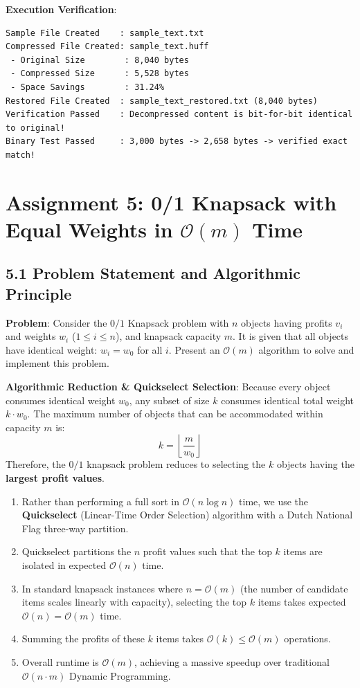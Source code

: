 \documentclass[12pt]{article}
\begin{document}
\textbf{Execution Verification}:
\begin{lstlisting}
Sample File Created    : sample_text.txt
Compressed File Created: sample_text.huff
 - Original Size        : 8,040 bytes
 - Compressed Size      : 5,528 bytes
 - Space Savings        : 31.24%
Restored File Created  : sample_text_restored.txt (8,040 bytes)
Verification Passed    : Decompressed content is bit-for-bit identical to original!
Binary Test Passed     : 3,000 bytes -> 2,658 bytes -> verified exact match!
\end{lstlisting}

\newpage

\section*{Assignment 5: 0/1 Knapsack with Equal Weights in $\mathcal{O}(m)$ Time}

\subsection*{5.1 Problem Statement and Algorithmic Principle}
\textbf{Problem}: Consider the $0/1$ Knapsack problem with $n$ objects having profits $v_i$ and weights $w_i$ ($1 \le i \le n$), and knapsack capacity $m$. It is given that all objects have identical weight: $w_i = w_0$ for all $i$. Present an $\mathcal{O}(m)$ algorithm to solve and implement this problem.

\textbf{Algorithmic Reduction \& Quickselect Selection}:
Because every object consumes identical weight $w_0$, any subset of size $k$ consumes identical total weight $k \cdot w_0$. The maximum number of objects that can be accommodated within capacity $m$ is:
\[
k = \left\lfloor \frac{m}{w_0} \right\rfloor
\]
Therefore, the $0/1$ knapsack problem reduces to selecting the $k$ objects having the \textbf{largest profit values}.
\begin{enumerate}
    \item Rather than performing a full sort in $\mathcal{O}(n \log n)$ time, we use the \textbf{Quickselect} (Linear-Time Order Selection) algorithm with a Dutch National Flag three-way partition.
    \item Quickselect partitions the $n$ profit values such that the top $k$ items are isolated in expected $\mathcal{O}(n)$ time.
    \item In standard knapsack instances where $n = \mathcal{O}(m)$ (the number of candidate items scales linearly with capacity), selecting the top $k$ items takes expected $\mathcal{O}(n) = \mathcal{O}(m)$ time.
    \item Summing the profits of these $k$ items takes $\mathcal{O}(k) \le \mathcal{O}(m)$ operations.
    \item Overall runtime is $\mathcal{O}(m)$, achieving a massive speedup over traditional $\mathcal{O}(n \cdot m)$ Dynamic Programming.
\end{enumerate}
\end{document}
